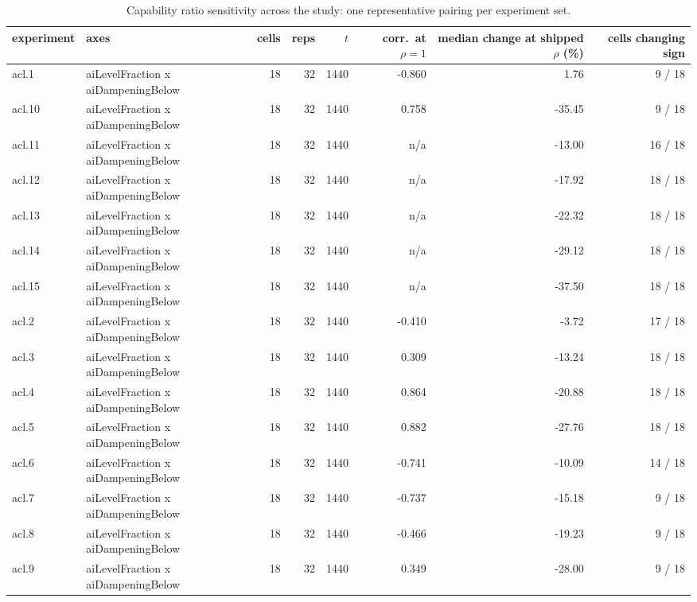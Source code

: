 \begin{table}[htbp]
  \centering
  \caption{Capability ratio sensitivity across the study: one representative pairing per experiment set.}
  \label{tab:rho-experiments}
  \begin{tabular}{l l r r r r r r}
    \toprule
    experiment & axes & cells & reps & $t$ & corr.\ at $\rho=1$ & median change at shipped $\rho$ (\%) & cells changing sign \\
    \midrule
    acl.1 & aiLevelFraction x aiDampeningBelow & 18 & 32 & 1440 & -0.860 & 1.76 & 9 / 18 \\
    acl.10 & aiLevelFraction x aiDampeningBelow & 18 & 32 & 1440 & 0.758 & -35.45 & 9 / 18 \\
    acl.11 & aiLevelFraction x aiDampeningBelow & 18 & 32 & 1440 & n/a & -13.00 & 16 / 18 \\
    acl.12 & aiLevelFraction x aiDampeningBelow & 18 & 32 & 1440 & n/a & -17.92 & 18 / 18 \\
    acl.13 & aiLevelFraction x aiDampeningBelow & 18 & 32 & 1440 & n/a & -22.32 & 18 / 18 \\
    acl.14 & aiLevelFraction x aiDampeningBelow & 18 & 32 & 1440 & n/a & -29.12 & 18 / 18 \\
    acl.15 & aiLevelFraction x aiDampeningBelow & 18 & 32 & 1440 & n/a & -37.50 & 18 / 18 \\
    acl.2 & aiLevelFraction x aiDampeningBelow & 18 & 32 & 1440 & -0.410 & -3.72 & 17 / 18 \\
    acl.3 & aiLevelFraction x aiDampeningBelow & 18 & 32 & 1440 & 0.309 & -13.24 & 18 / 18 \\
    acl.4 & aiLevelFraction x aiDampeningBelow & 18 & 32 & 1440 & 0.864 & -20.88 & 18 / 18 \\
    acl.5 & aiLevelFraction x aiDampeningBelow & 18 & 32 & 1440 & 0.882 & -27.76 & 18 / 18 \\
    acl.6 & aiLevelFraction x aiDampeningBelow & 18 & 32 & 1440 & -0.741 & -10.09 & 14 / 18 \\
    acl.7 & aiLevelFraction x aiDampeningBelow & 18 & 32 & 1440 & -0.737 & -15.18 & 9 / 18 \\
    acl.8 & aiLevelFraction x aiDampeningBelow & 18 & 32 & 1440 & -0.466 & -19.23 & 9 / 18 \\
    acl.9 & aiLevelFraction x aiDampeningBelow & 18 & 32 & 1440 & 0.349 & -28.00 & 9 / 18 \\

\end{tabular}
\end{table}
